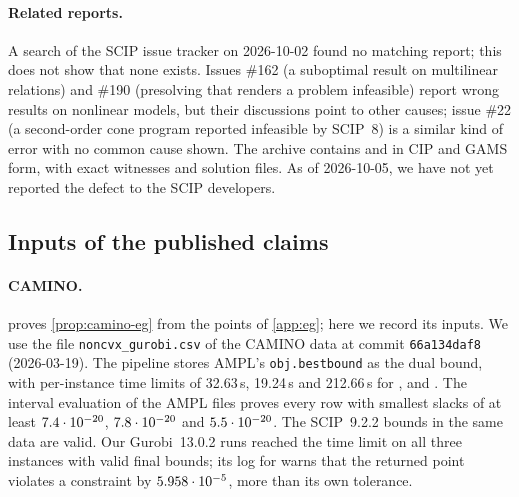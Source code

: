 \paragraph{Related reports.}
A search of the SCIP issue tracker on 2026-10-02 found no matching report; this does not show that none exists.
Issues \#162 (a suboptimal result on multilinear relations) and \#190 (presolving that renders a problem infeasible) report wrong results on nonlinear models, but their discussions point to other causes; issue \#22 (a second-order cone program reported infeasible by SCIP~8) is a similar kind of error with no common cause shown.
The archive contains  and  in CIP and GAMS form, with exact witnesses and solution files.
As of 2026-10-05, we have not yet reported the defect to the SCIP developers.

\subsection{Inputs of the published claims}\label{app:solvers-published}

\paragraph{CAMINO.}
 proves \cref{prop:camino-eg} from the points of \cref{app:eg}; here we record its inputs.
We use the file \texttt{noncvx\_gurobi.csv} of the CAMINO data \citep{ghezzi2026-camino-benchmark-results-for-nonconvex} at commit \texttt{66a134daf8} (2026-03-19).
The pipeline stores AMPL's \texttt{obj.bestbound} as the dual bound, with per-instance time limits of 32.63\,s, 19.24\,s and 212.66\,s for ,  and .
The interval evaluation of the AMPL files proves every row with smallest slacks of at least $7.4\cdot 10^{-20}$, $7.8\cdot 10^{-20}$ and $5.5\cdot 10^{-20}$.
The SCIP~9.2.2 bounds in the same data are valid.
Our Gurobi~13.0.2 runs reached the time limit on all three instances with valid final bounds; its log for  warns that the returned point violates a constraint by $5.958\cdot 10^{-5}$, more than its own tolerance.

\begin{certbox}
\end{certbox}

